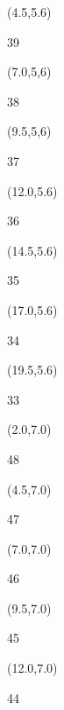 \documentclass[a4paper]{article}
\newcommand{\myseat}[5]{%
\vspace{-0.1cm} \hspace{-0.5cm}
\parbox[t][2.2cm][t]{3.5cm}{%
\small #1 %
\begin{description}
\vspace{-0.1cm}
\item [ID:] #2
\vspace{-0.1cm}
\item [Team:] #3 \normalsize
\vspace{-0.1cm}
\item \normalsize #4 #5
\vspace{-0.1cm}
\end{description}
}
}
\begin{document}
\begin{CJK}{UTF8}{cyberbit}
\begin{textblock}{2.5}(4.5,5.6)
\textblockcolor{}
\myseat{39}{}{}{}{}
\end{textblock}

\begin{textblock}{2.5}(7.0,5,6)
\textblockcolor{}
\myseat{38}{}{}{}{}
\end{textblock}

\begin{textblock}{2.5}(9.5,5,6)
\textblockcolor{}
\myseat{37}{}{}{}{}
\end{textblock}

\begin{textblock}{2.5}(12.0,5.6)
\textblockcolor{}
\myseat{36}{}{}{}{}
\end{textblock}

\begin{textblock}{2.5}(14.5,5.6)
\textblockcolor{}
\myseat{35}{}{}{}{}
\end{textblock}

\begin{textblock}{2.5}(17.0,5.6)
\textblockcolor{}
\myseat{34}{}{}{}{}
\end{textblock}

\begin{textblock}{2.5}(19.5,5.6)
\textblockcolor{}
\myseat{33}{}{}{}{}
\end{textblock}


\begin{textblock}{2.5}(2.0,7.0)
\textblockcolor{}
\myseat{48}{}{}{}{}
\end{textblock}

\begin{textblock}{2.5}(4.5,7.0)
\textblockcolor{}
\myseat{47}{}{}{}{}
\end{textblock}

\begin{textblock}{2.5}(7.0,7.0)
\textblockcolor{}
\myseat{46}{}{}{}{}
\end{textblock}

\begin{textblock}{2.5}(9.5,7.0)
\textblockcolor{}
\myseat{45}{}{}{}{}
\end{textblock}

\begin{textblock}{2.5}(12.0,7.0)
\textblockcolor{}
\myseat{44}{}{}{}{}
\end{textblock}


\end{CJK}
\end{document}
